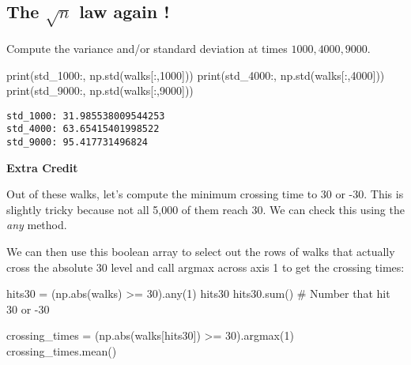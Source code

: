 \documentclass[
  letterpaper,
  DIV=11,
  numbers=noendperiod]{scrreprt}
\newenvironment{Shaded}{\begin{snugshade}}{\end{snugshade}}
\newcommand{\BuiltInTok}[1]{\textcolor[rgb]{0.00,0.23,0.31}{#1}}
\newcommand{\CommentTok}[1]{\textcolor[rgb]{0.37,0.37,0.37}{#1}}
\newcommand{\DecValTok}[1]{\textcolor[rgb]{0.68,0.00,0.00}{#1}}
\newcommand{\NormalTok}[1]{\textcolor[rgb]{0.00,0.23,0.31}{#1}}
\newcommand{\OperatorTok}[1]{\textcolor[rgb]{0.37,0.37,0.37}{#1}}
\newcommand{\StringTok}[1]{\textcolor[rgb]{0.13,0.47,0.30}{#1}}
\begin{document}
\hypertarget{the-sqrtn-law-again}{%
\subsection{\texorpdfstring{The \(\sqrt{n}\) law again
!}{The \textbackslash sqrt\{n\} law again !}}\label{the-sqrtn-law-again}}

Compute the variance and/or standard deviation at times
\(1000, 4000, 9000\).

\begin{Shaded}
\begin{Highlighting}[]
\BuiltInTok{print}\NormalTok{(}\StringTok{\textquotesingle{}std\_1000:\textquotesingle{}}\NormalTok{, np.std(walks[:,}\DecValTok{1000}\NormalTok{]))}
\BuiltInTok{print}\NormalTok{(}\StringTok{\textquotesingle{}std\_4000:\textquotesingle{}}\NormalTok{, np.std(walks[:,}\DecValTok{4000}\NormalTok{]))}
\BuiltInTok{print}\NormalTok{(}\StringTok{\textquotesingle{}std\_9000:\textquotesingle{}}\NormalTok{, np.std(walks[:,}\DecValTok{9000}\NormalTok{]))}
\end{Highlighting}
\end{Shaded}

\begin{verbatim}
std_1000: 31.985538009544253
std_4000: 63.65415401998522
std_9000: 95.417731496824
\end{verbatim}

\textbf{Extra Credit}

Out of these walks, let's compute the minimum crossing time to 30 or
-30. This is slightly tricky because not all 5,000 of them reach 30. We
can check this using the \emph{any} method.

We can then use this boolean array to select out the rows of walks that
actually cross the absolute 30 level and call argmax across axis 1 to
get the crossing times:

\begin{Shaded}
\begin{Highlighting}[]
\NormalTok{hits30 }\OperatorTok{=}\NormalTok{ (np.}\BuiltInTok{abs}\NormalTok{(walks) }\OperatorTok{\textgreater{}=} \DecValTok{30}\NormalTok{).}\BuiltInTok{any}\NormalTok{(}\DecValTok{1}\NormalTok{)}
\NormalTok{hits30}
\NormalTok{hits30.}\BuiltInTok{sum}\NormalTok{() }\CommentTok{\# Number that hit 30 or {-}30}

\NormalTok{crossing\_times }\OperatorTok{=}\NormalTok{ (np.}\BuiltInTok{abs}\NormalTok{(walks[hits30]) }\OperatorTok{\textgreater{}=} \DecValTok{30}\NormalTok{).argmax(}\DecValTok{1}\NormalTok{)}
\NormalTok{crossing\_times.mean()}
\end{Highlighting}
\end{Shaded}
\end{document}
